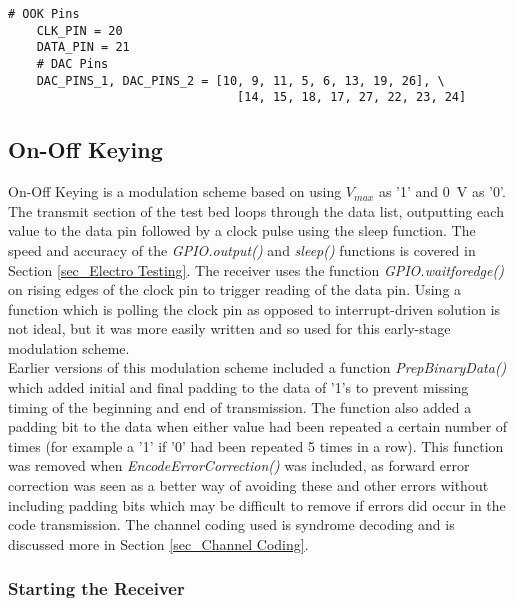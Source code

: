 \documentclass[../main.tex]{subfiles}
\begin{document}
\begin{lstlisting}[caption={Pins used for OOK and the DACs}, label={lst_Pins}]
	# OOK Pins
	CLK_PIN = 20
	DATA_PIN = 21
	# DAC Pins
	DAC_PINS_1, DAC_PINS_2 = [10, 9, 11, 5, 6, 13, 19, 26], \
								[14, 15, 18, 17, 27, 22, 23, 24]
\end{lstlisting} 

\subsection{On-Off Keying} \label{sec_On-Off Keying}

On-Off Keying is a modulation scheme based on using $V_{max}$ as '1' and \SI{0}{\volt} as '0'.
The transmit section of the test bed loops through the data list, outputting each value to the data pin followed by a clock pulse using the sleep function.
The speed and accuracy of the \textit{GPIO.output()} and \textit{sleep()} functions is covered in Section \ref{sec_Electro Testing}.
The receiver uses the function \textit{GPIO.wait\textunderscore for\textunderscore edge()} on rising edges of the clock pin to trigger reading of the data pin.
Using a function which is polling the clock pin as opposed to interrupt-driven solution is not ideal, but it was more easily written and so used for this early-stage modulation scheme.\\

Earlier versions of this modulation scheme included a function \textit{Prep\textunderscore Binary\textunderscore Data()} which added initial and final padding to the data of '1's to prevent missing timing of the beginning and end of transmission.
The function also added a padding bit to the data when either value had been repeated a certain number of times (for example a '1' if '0' had been repeated 5 times in a row).
This function was removed when \textit{Encode\textunderscore Error\textunderscore Correction()} was included, as forward error correction was seen as a better way of avoiding these and other errors without including padding bits which may be difficult to remove if errors did occur in the code transmission.
The channel coding used is syndrome decoding and is discussed more in Section \ref{sec_Channel Coding}.\\


\subsubsection{Starting the Receiver} \label{sec_SSH}
\end{document}
